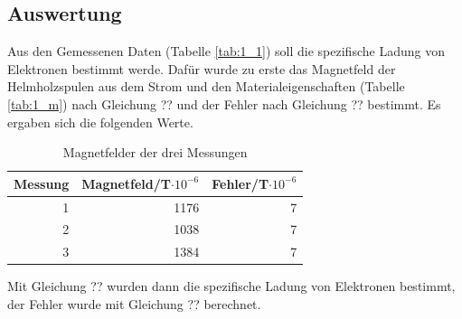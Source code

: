 \documentclass[12pt,a4paper]{article}
\begin{document}
\subsection{Auswertung}

Aus den Gemessenen Daten (Tabelle \ref{tab:1_1}) soll die spezifische Ladung von Elektronen bestimmt werde. Dafür wurde zu erste das Magnetfeld der Helmholzspulen aus dem Strom und den Materialeigenschaften (Tabelle \ref{tab:1_m}) nach Gleichung ?? und der Fehler nach Gleichung ??  bestimmt. Es ergaben sich die folgenden Werte.

\begin{table}[H]
\caption{Magnetfelder der drei Messungen}
\begin{center}
\begin{tabular}{|r|r|r|}
\hline
\multicolumn{1}{|l|}{Messung} & \multicolumn{1}{l|}{Magnetfeld/T$\cdot 10^{-6}$} & \multicolumn{1}{l|}{Fehler/T$\cdot 10^{-6}$} \\ \hline
1 & 1176 & 7 \\ \hline
2 & 1038 & 7 \\ \hline
3 & 1384 & 7 \\ \hline
\end{tabular}
\end{center}
\label{tab:aus_b}
\end{table}

Mit Gleichung ?? wurden dann die spezifische Ladung von Elektronen bestimmt, der Fehler wurde mit Gleichung ?? berechnet.
\end{document}
